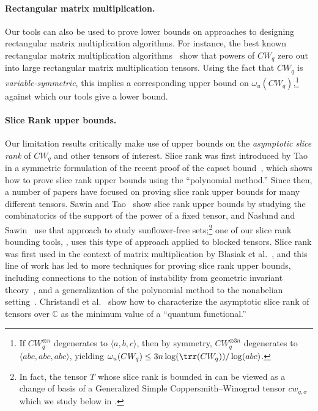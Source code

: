 \documentclass{toc}
\begin{document}
%
\paragraph{Rectangular matrix multiplication.} Our tools can also be used to prove lower bounds on approaches to designing rectangular matrix multiplication algorithms. For instance, the best known rectangular matrix multiplication algorithms~\cite{legallrect2} show that powers of $CW_q$ zero out into large rectangular matrix multiplication tensors. Using the fact that $CW_q$ is \emph{variable-symmetric}, this implies a corresponding upper bound on $\omega_u(CW_q)$,\footnote{If $CW_q^{\otimes n}$ degenerates to $\langle a,b,c \rangle$, then by symmetry, $CW_q^{\otimes 3n}$ degenerates to $\langle abc, abc, abc \rangle$, yielding $\omega_u(CW_q) \leq 3 n \log (\trr(CW_q)) / \log (abc)$.}
%
against which our tools give a lower bound.  %

%
\paragraph{Slice Rank upper bounds.} Our limitation results critically make use of upper bounds on the \emph{asymptotic slice rank} of $CW_q$ and other tensors of interest. Slice rank was first introduced by Tao~\cite{tao1} in a symmetric formulation of the recent proof of the capset bound~\cite{clp,eg}, which shows how to prove slice rank upper bounds using the ``polynomial method.'' Since then, a number of papers have focused on proving slice rank upper bounds for many different tensors. Sawin and Tao~\cite[Proposition~6]{tao2} show slice rank upper bounds by studying the combinatorics of the support of the power of a fixed tensor, and Naslund and Sawin~\cite{naslund2017upper} use that approach to study sunflower-free sets;\footnote{In fact, the tensor $T$ whose slice rank is bounded in \cite[Section~3]{naslund2017upper} can be viewed as a change of basis of a Generalized Simple Coppersmith--Winograd tensor $cw_{q,\sigma}$ which we study below in .} one of our slice rank bounding tools, , uses this type of approach applied to blocked tensors. Slice rank was first used in the context of matrix multiplication by Blasiak et al.~\cite{blasiak}, and this line of work has led to more techniques for proving slice rank upper bounds, including connections to the notion of instability from geometric invariant theory~\cite{blasiak}, and a generalization of the polynomial method to the nonabelian setting~\cite{blasiak2017groups}. Christandl et al.~\cite{quantum} show how to characterize the asymptotic slice rank of tensors over $\mathbb{C}$ as the minimum value of a ``quantum functional.''
\end{document}
